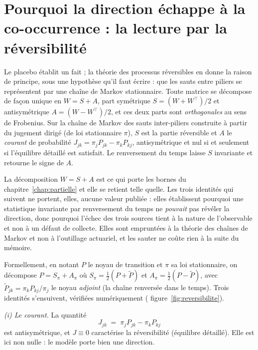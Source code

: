 
\section{Pourquoi la direction échappe à la co-occurrence : la lecture par la réversibilité}

Le placebo établit un fait ; la théorie des processus réversibles en donne la raison de principe,
sous une hypothèse qu'il faut écrire : que les sauts entre piliers se représentent par une chaîne
de Markov stationnaire. Toute matrice se décompose de façon unique en $W=S+A$, part
symétrique $S=(W+W^\top)/2$ et antisymétrique $A=(W-W^\top)/2$, et ces deux parts sont
\emph{orthogonales} au sens de Frobenius. Sur la chaîne de Markov des sauts inter-piliers construite à partir
du jugement dirigé (de loi stationnaire $\pi$), $S$ est la partie réversible et $A$ le
\emph{courant} de probabilité $J_{jk}=\pi_j P_{jk}-\pi_k P_{kj}$, antisymétrique et nul si et
seulement si l'équilibre détaillé est satisfait. Le renversement du temps laisse $S$ invariante
et retourne le signe de $A$.

La décomposition $W=S+A$ est ce qui porte les bornes du chapitre~\ref{chap:partielle} et elle se
retient telle quelle. Les trois identités qui suivent ne portent, elles, aucune valeur publiée :
elles établissent pourquoi une statistique invariante par renversement du temps ne \emph{pouvait}
pas révéler la direction, donc pourquoi l'échec des trois sources tient à la nature de
l'observable et non à un défaut de collecte. Elles sont empruntées à la théorie des chaînes de
Markov et non à l'outillage actuariel, et les sauter ne coûte rien à la suite du mémoire.

Formellement, en notant $P$ le noyau de transition et $\pi$ sa loi stationnaire, on décompose
$P = S_\pi + A_\pi$ où $S_\pi=\tfrac12(P+\tilde P)$ et $A_\pi=\tfrac12(P-\tilde P)$, avec
$\tilde P_{jk} = \pi_k P_{kj}/\pi_j$ le noyau \emph{adjoint} (la chaîne renversée dans le temps).
Trois identités s'ensuivent, vérifiées numériquement (%
figure~\ref{fig:reversibilite}).

\emph{(i) Le courant.} La quantité
\begin{equation}
  J_{jk} \;=\; \pi_j P_{jk} - \pi_k P_{kj}
  \label{eq:courant}
\end{equation}
est antisymétrique, et $J\equiv 0$ caractérise la réversibilité (équilibre détaillé). Elle est
ici non nulle : le modèle porte bien une direction.

